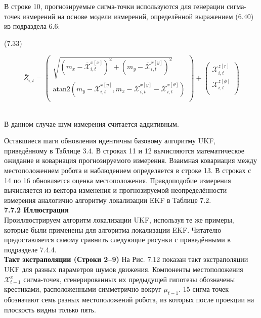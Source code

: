 \documentclass[10pt,a4paper]{article}
\begin{document}
В строке 10, прогнозируемые сигма-точки используются для генерации сигма-точек измерений на основе модели измерений, определённой выражением (6.40) из подраздела 6.6:

(7.33)
\begin{minipage}{0.2\textwidth}\begin{equation*}
\bar{Z}_{i,t}=
\left(\begin{array}{c}
\sqrt{(m_x-\bar{\mathcal{X}}_{i,t}^{x[x]})^2+(m_y-\bar{\mathcal{X}}_{i,t}^{x[y]})^2}\\	
\text{atan}2(m_y-\bar{\mathcal{X}}_{i,t}^{x[y]},m_x-\bar{\mathcal{X}}_{i,t}^{x[y]}-\bar{\mathcal{X}}_{i,t}^{x[\theta]})\\
\end{array}\right)
+
\left(\begin{array}{c}
\mathcal{X}_{i,t}^{z[r]}\\
\mathcal{X}_{i,t}^{z[\phi]}\\
\end{array}\right)
\end{equation*}
\end{minipage}\\

В данном случае шум измерения считается аддитивным.

Оставшиеся шаги обновления идентичны базовому алгоритму UKF, приведённому в Таблице 3.4. В строках 11 и 12 вычисляются математическое ожидание и ковариация прогнозируемого измерения. Взаимная ковариация между местоположением робота и наблюдением определяется в строке 13. В строках с 14 по 16 обновляется оценка местоположения. Правдоподобие измерения вычисляется из вектора изменения и прогнозируемой неопределённости измерения аналогично алгоритму локализации EKF в Таблице 7.2.\\

\textbf{7.7.2 Иллюстрация}\\

Проиллюстрируем алгоритм локализации UKF, используя те же примеры, которые были применены для алгоритма локализации EKF. Читателю предоставляется самому сравнить следующие рисунки с приведёнными в подразделе  7.4.4.\\

\textbf{Такт экстраполяции (Строки 2–9)} На Рис. 7.12 показан такт экстраполяции UKF для разных параметров шумов движения. Компоненты местоположения$\mathcal{X}_{t-1}^x$ сигма-точек, сгенерированных их предыдущей гипотезы обозначены крестиками, расположенными симметрично вокруг $\mu_{t-1}$. 15 сигма-точек обозначают семь разных местоположений робота, из которых после проекции на плоскость видны только пять.
\end{document}
